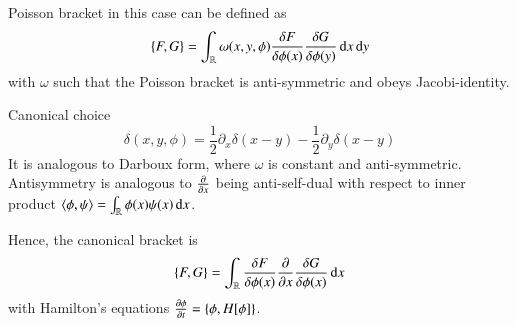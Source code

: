 \begin{definition}Poisson bracket in this case can be defined as 
	\begin{equation*}
		\pb{F}{G} = \int_{\R} \omega(x, y, \phi) \fdv{F}{\phi(x)} \fdv{G}{\phi(y)} \dd{x} \dd{y}
	\end{equation*}
with $\omega$ such that the Poisson bracket is anti-symmetric and obeys Jacobi-identity.
\end{definition}

Canonical choice
\begin{equation*}
	\delta(x, y, \phi) = \frac{1}{2} \partial_x \delta(x-y) - \frac{1}{2} \partial_y \delta(x-y)
\end{equation*}
It is analogous to Darboux form, where $\omega$ is constant and anti-symmetric. Antisymmetry is analogous to $\pdv{x}$ being anti-self-dual with respect to inner product $\langle \phi, \psi \rangle = \int_{\mathbb{R}} \phi(x) \psi(x) \dd{x}$. 

Hence, the canonical bracket is 
\begin{equation*}
	\pb{F}{G} = \int_{\R} \fdv{F}{\phi(x)} \pdv{x} \fdv{G}{\phi(x)} \dd{x}
\end{equation*}
with Hamilton's equations $\pdv{\phi}{t} = \pb{\phi}{H[\phi]}$.
